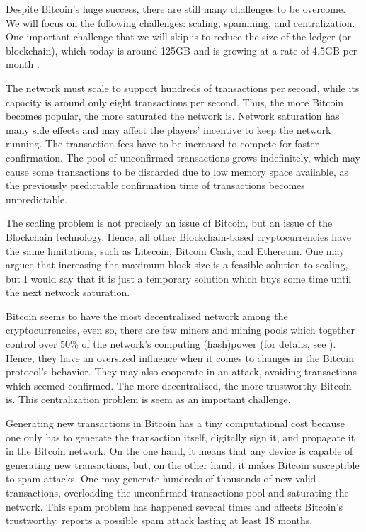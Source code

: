 Despite Bitcoin's huge success, there are still many challenges to be overcome. We will focus on the following challenges: scaling, spamming, and centralization. One important challenge that we will skip is to reduce the size of the ledger (or blockchain), which today is around 125GB and is growing at a rate of 4.5GB per month \citep{blockchaininfosize}.

The network must scale to support hundreds of transactions per second, while its capacity is around only eight transactions per second. Thus, the more Bitcoin becomes popular, the more saturated the network is. Network saturation has many side effects and may affect the players' incentive to keep the network running. The transaction fees have to be increased to compete for faster confirmation. The pool of unconfirmed transactions grows indefinitely, which may cause some transactions to be discarded due to low memory space available, as the previously predictable confirmation time of transactions becomes unpredictable.

The scaling problem is not precisely an issue of Bitcoin, but an issue of the Blockchain technology. Hence, all other Blockchain-based cryptocurrencies have the same limitations, such as Litecoin, Bitcoin Cash, and Ethereum. One may arguee that increasing the maximum block size is a feasible solution to scaling, but I would say that it is just a temporary solution which buys some time until the next network saturation.

Bitcoin seems to have the most decentralized network among the cryptocurrencies, even so, there are few miners and mining pools which together control over 50\% of the network’s computing (hash)power (for details, see \citet{gencer2018decentralization}). Hence, they have an oversized influence when it comes to changes in the Bitcoin protocol's behavior. They may also cooperate in an attack, avoiding transactions which seemed confirmed. The more decentralized, the more trustworthy Bitcoin is. This centralization problem is seem as an important challenge.

Generating new transactions in Bitcoin has a tiny computational cost because one only has to generate the transaction itself, digitally sign it, and propagate it in the Bitcoin network. On the one hand, it means that any device is capable of generating new transactions, but, on the other hand, it makes Bitcoin susceptible to spam attacks. One may generate hundreds of thousands of new valid transactions, overloading the unconfirmed transactions pool and saturating the network. This spam problem has happened several times and affects Bitcoin's trustworthy. \citet{bitcoinspam2017} reports a possible spam attack lasting at least 18 months.

